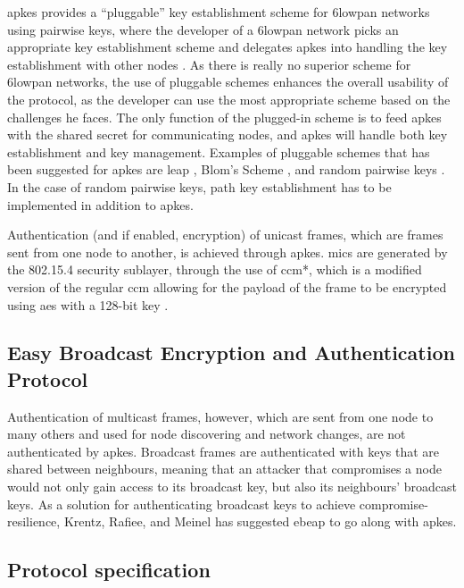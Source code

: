 \gls{apkes} provides a ``pluggable'' key establishment scheme for \gls{6lowpan} networks using pairwise keys, where the developer of a \gls{6lowpan} network picks an appropriate key establishment scheme and delegates \gls{apkes} into handling the key establishment with other nodes \cite{krentz20136lowpan}. As there is really no superior scheme for \gls{6lowpan} networks, the use of pluggable schemes enhances the overall usability of the protocol, as the developer can use the most appropriate scheme based on the challenges he faces. The only function of the plugged-in scheme is to feed \gls{apkes} with the shared secret for communicating nodes, and \gls{apkes} will handle both key establishment and key management. Examples of pluggable schemes that has been suggested for \gls{apkes} are \gls{leap} \cite{zhu2006leap+}, Blom's Scheme \cite{blom1984optimal}, and random pairwise keys \cite{chan2003random}. In the case of random pairwise keys, path key establishment has to be implemented in addition to \gls{apkes}.

Authentication (and if enabled, encryption) of unicast frames, which are frames sent from one node to another, is achieved through \gls{apkes}. \gls{mic}s are generated by the 802.15.4 security sublayer, through the use of \gls{ccm}*, which is a modified version of the regular \gls{ccm} allowing for the payload of the frame to be encrypted using \gls{aes} with a 128-bit key \cite{krentz20136lowpan}.




\subsection{Easy Broadcast Encryption and Authentication Protocol}

Authentication of multicast frames, however, which are sent from one node to many others and used for node discovering and network changes, are not authenticated by \gls{apkes}. Broadcast frames are authenticated with keys that are shared between neighbours, meaning that an attacker that compromises a node would not only gain access to its broadcast key, but also its neighbours' broadcast keys. As a solution for authenticating broadcast keys to achieve compromise-resilience, Krentz, Rafiee, and Meinel has suggested \gls{ebeap} to go along with \gls{apkes}. 


\subsection{Protocol specification}

